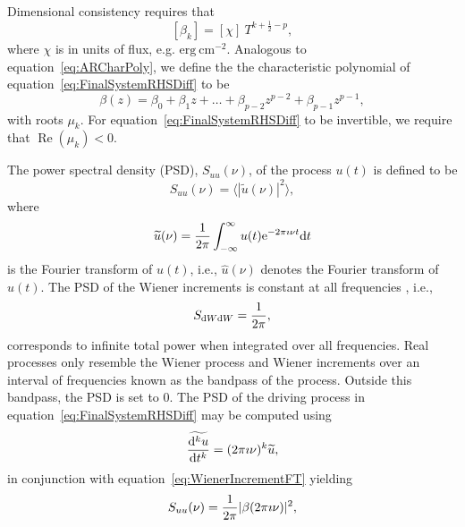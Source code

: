 \documentclass[a4paper,fleqn,usenatbib]{mnras}
\begin{document}
Dimensional consistency requires that
\begin{equation}\label{eq:MAUnits}
[\beta_{k}] = [\chi]~T^{k+\frac{1}{2}-p},
\end{equation}
where $\chi$ is in units of flux, e.g. $\mathrm{erg}~\mathrm{cm}^{-2}$. Analogous to equation~\eqref{eq:ARCharPoly}, we define the the characteristic polynomial of equation~\eqref{eq:FinalSystemRHSDiff} to be
\begin{equation}\label{eq:MACharPoly}
\beta(z) = \beta_{0} + \beta_{1} z + \ldots + \beta_{p-2} z^{p-2} + \beta_{p-1} z^{p-1},
\end{equation}
with roots $\mu_{k}$. For equation~\eqref{eq:FinalSystemRHSDiff} to be invertible, we require that $\operatorname{Re}(\mu_{k}) < 0$.

The power spectral density (PSD), $S_{uu}(\nu)$, of the process $u(t)$ is defined to be
\begin{equation}\label{eq:PSD}
S_{uu}(\nu) = \langle |\widetilde{u}(\nu)|^{2} \rangle,
\end{equation}
where
\begin{equation}\label{eq:FT}
\widetilde{u}(\nu) = \frac{1}{2\pi} \int_{-\infty}^{\infty}u(t)\mathrm{e}^{-2\pi \imath \nu t}\mathrm{d}t
\end{equation}
is the Fourier transform of $u(t)$, i.e., $\widehat{u}(\nu)$ denotes the Fourier transform of $u(t)$. The PSD of the Wiener increments is constant at all frequencies \citep{HandbookOfStatistics19Brockwell}, i.e.,
\begin{equation}\label{eq:WienerIncrementFT}
S_{\mathrm{d}W\mathrm{d}W} = \frac{1}{2 \pi},
\end{equation}
corresponds to infinite total power when integrated over all frequencies. Real processes only resemble the Wiener process and Wiener increments over an interval of frequencies known as the bandpass of the process. Outside this bandpass, the PSD is set to $0$. The PSD of the driving process in equation~\eqref{eq:FinalSystemRHSDiff} may be computed using
\begin{equation}\label{eq:FTDerivative}
\widetilde{\frac{\mathrm{d}^{k}u}{\mathrm{d}t^{k}}} = (2 \pi \imath \nu)^{k}\widetilde{u},
\end{equation}
in conjunction with equation~\eqref{eq:WienerIncrementFT} yielding
\begin{equation}\label{eq:RHSPSD}
S_{uu}(\nu) = \frac{1}{2 \pi } |\beta(2 \pi \imath \nu)|^{2},
\end{equation}
\end{document}
